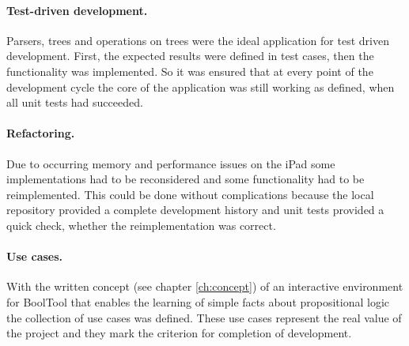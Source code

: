 \paragraph{Test-driven development.}

Parsers, trees and operations on trees were the ideal application for test driven development.
First, the expected results were defined in test cases, then the functionality was implemented.
So it was ensured that at every point of the development cycle 
the core of the application was still working as defined,
when all unit tests had succeeded.

\paragraph{Refactoring.}
Due to occurring memory and performance issues on the iPad
some implementations had to be reconsidered 
and some functionality had to be reimplemented.
This could be done without complications because 
the local repository provided a complete development history 
and unit tests provided a quick check, whether the reimplementation was correct.

\paragraph{Use cases.}
With the written concept (see chapter \vref{ch:concept}) of an interactive environment for BoolTool 
that enables the learning  of simple facts about propositional logic the collection of use cases was defined. 
These use cases represent the real value of the project 
and they mark the criterion for completion of development.

